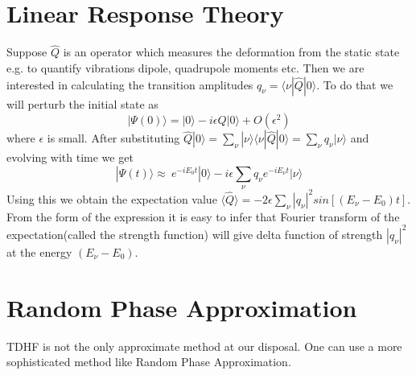 \documentclass[a4paper]{paper}
\begin{document}
        \section{Linear Response Theory}\label{Linear}
            Suppose $\hat{Q}$ is an operator which measures the deformation from the static state e.g. to quantify vibrations dipole, quadrupole moments etc. Then we are interested in calculating the transition amplitudes $q_{\nu} = \langle \nu | \hat{Q} | 0 \rangle$. To do that we will perturb the initial state as 
            \begin{equation}
                |\Psi (0)\rangle = |0 \rangle - i\epsilon \hat{Q}|0\rangle + O(\epsilon^{2})
            \end{equation}
            where $\epsilon$ is small.
            After substituting $\hat{Q}|0\rangle = \sum_{\nu} |\nu\rangle\langle\nu|\hat{Q}|0\rangle = \sum_{\nu}q_{\nu}|\nu\rangle$ and evolving with time we get
            \begin{equation}
                |\Psi(t)\rangle \approx \ e^{-iE_{0}t}|0\rangle - i\epsilon\sum_{\nu}q_{\nu}e^{-iE_{\nu}t}|\nu\rangle
            \end{equation} 
            Using this we obtain the expectation value $\langle\hat{Q}\rangle = -2\epsilon\sum_{\nu}|q_{\nu}|^2 sin[(E_{\nu}-E_0)t]$. From the form of the expression it is easy to infer that Fourier transform of the expectation(called the strength function) will give delta function of strength $|q_{\nu}|^2$ at the energy $(E_{\nu}-E_0)$.
        \section{Random Phase Approximation}
            TDHF is not the only approximate method at our disposal. One can use a more sophisticated method like Random Phase Approximation.
\end{document}

